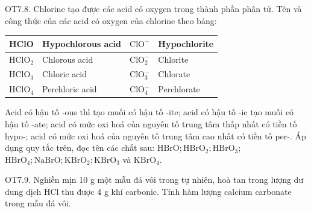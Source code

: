 \documentclass[10pt]{article}
\begin{document}
OT7.8. Chlorine tạo được các acid có oxygen trong thành phần phân tử. Tên và công thức của các acid có oxygen của chlorine theo bảng:

\begin{center}
\begin{tabular}{|l|l|l|l|}
\hline
HClO & Hypochlorous acid & $\mathrm{ClO}^{-}$ & Hypochlorite \\
\hline
$\mathrm{HClO}_{2}$ & Chlorous acid & $\mathrm{ClO}_{2}^{-}$ & Chlorite \\
\hline
$\mathrm{HClO}_{3}$ & Chloric acid & $\mathrm{ClO}_{3}^{-}$ & Chlorate \\
\hline
$\mathrm{HClO}_{4}$ & Perchloric acid & $\mathrm{ClO}_{4}^{-}$ & Perchlorate \\
\hline
\end{tabular}
\end{center}

Acid có hậu tố -ous thì tạo muối có hậu tố -ite; acid có hậu tố -ic tạo muối có hậu tố -ate; acid có mức oxi hoá của nguyên tố trung tâm thấp nhất có tiền tố hypo-; acid có mức oxi hoá của nguyên tố trung tâm cao nhất có tiền tố per-. Áp dụng quy tắc trên, đọc tên các chất sau: $\mathrm{HBrO} ; \mathrm{HBrO}_{2} ; \mathrm{HBrO}_{3}$; $\mathrm{HBrO}_{4} ; \mathrm{NaBrO} ; \mathrm{KBrO}_{2} ; \mathrm{KBrO}_{3}$ và $\mathrm{KBrO}_{4}$.

OT7.9. Nghiền mịn 10 g một mẫu đá vôi trong tự nhiên, hoà tan trong lượng dư dung dịch HCl thu được 4 g khí carbonic. Tính hàm lượng calcium carbonate trong mẫu đá vôi.
\end{document}
